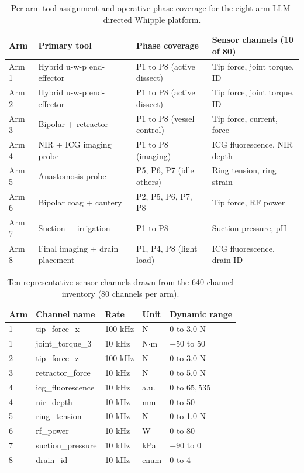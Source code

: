 \begin{table}[H]
\caption{Per-arm tool assignment and operative-phase coverage for the eight-arm
LLM-directed Whipple platform.}
\label{tab:sec06-arms}
\centering
\begin{tabularx}{\textwidth}{L{1.2cm} L{4.4cm} L{4.0cm} Y}
\toprule
\textbf{Arm} & \textbf{Primary tool} & \textbf{Phase coverage} & \textbf{Sensor channels (10 of 80)} \\
\midrule
Arm 1 & Hybrid u-w-p end-effector & P1 to P8 (active dissect) & Tip force, joint torque, ID \\
Arm 2 & Hybrid u-w-p end-effector & P1 to P8 (active dissect) & Tip force, joint torque, ID \\
Arm 3 & Bipolar + retractor & P1 to P8 (vessel control) & Tip force, current, force \\
Arm 4 & NIR + ICG imaging probe & P1 to P8 (imaging) & ICG fluorescence, NIR depth \\
Arm 5 & Anastomosis probe & P5, P6, P7 (idle others) & Ring tension, ring strain \\
Arm 6 & Bipolar coag + cautery & P2, P5, P6, P7, P8 & Tip force, RF power \\
Arm 7 & Suction + irrigation & P1 to P8 & Suction pressure, pH \\
Arm 8 & Final imaging + drain placement & P1, P4, P8 (light load) & ICG fluorescence, drain ID \\
\bottomrule
\end{tabularx}
\end{table}

\begin{table}[H]
\caption{Ten representative sensor channels drawn from the 640-channel inventory
(80 channels per arm).}
\label{tab:sec06-sensors}
\centering
\begin{tabularx}{\textwidth}{L{1.0cm} L{4.6cm} L{2.2cm} L{2.4cm} Y}
\toprule
\textbf{Arm} & \textbf{Channel name} & \textbf{Rate} & \textbf{Unit} & \textbf{Dynamic range} \\
 & tip\_force\_x & 100 kHz & N & 0 to 3.0 N \\
1 & joint\_torque\_3 & 10 kHz & N$\cdot$m & $-50$ to $50$ \\
2 & tip\_force\_z & 100 kHz & N & 0 to 3.0 N \\
3 & retractor\_force & 10 kHz & N & 0 to 5.0 N \\
4 & icg\_fluorescence & 10 kHz & a.u. & 0 to $65{,}535$ \\
4 & nir\_depth & 10 kHz & mm & 0 to 50 \\
5 & ring\_tension & 10 kHz & N & 0 to 1.0 N \\
6 & rf\_power & 10 kHz & W & 0 to 80 \\
7 & suction\_pressure & 10 kHz & kPa & $-90$ to 0 \\
8 & drain\_id & 10 kHz & enum & 0 to 4 \\
\bottomrule
\end{tabularx}
\end{table}

